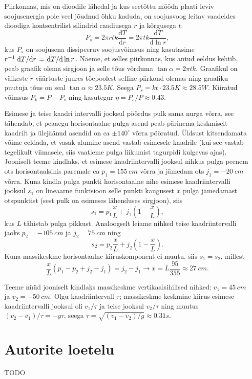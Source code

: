 \documentclass[10pt]{article}
\begin{document}

\solu
Piirkonnas, mis on dioodile lähedal ja kus seetõttu mööda plaati leviv soojusenergia pole veel jõudnud õhku kaduda, on soojusvoog leitav vaadeldes dioodiga kontsentrilist silindrid raadiusega $r$ ja kõrgusega $t$:
\[
P_s=2\pi rtk \frac{\mathrm d T}{\mathrm d r}=2\pi tk \frac{\mathrm d T}{\mathrm d \ln r},
\]
kus $P_s$ on soojusena dissipeeruv soojusvõimsus ning kasutasime $r^{-1}\dv*{T}{r} = \dv*{T}{\ln r}$. Näeme, et selles piirkonnas, kus antud eeldus kehtib, peab graafik olema sirgjoon ja selle tõus võrduma $\tan\alpha=2\pi tk$. Graafikul on väikeste $r$ väärtuste juures tõepoolest selline piirkond olemas ning graafiku puutuja tõus on seal $\tan\alpha\approx\SI{23.5}K$. Seega $P_s=kt\cdot \SI{23.5}K\approx \SI{28.5}W$. Kiiratud võimsus $P_k=P-P_s$ ning kasutegur $\eta=P_s/P\approx 0.43$.
\probend
\bigskip


\solu
Esimese ja teise kaadri intervalli jooksul pöördus pulk sama nurga võrra, see tähendab, et peaaegu horisontaalne pulga asend peab pärinema keskmiselt kaadrilt ja ülejäänud asendid on ca $\pm 140^\circ$ võrra pööratud. Üldsust kitsendamata võime eeldada, et vasak alumine asend vastab esimesele kaadrile (kui see vastab tegelikult viimasele, siis vaatleme pulga liikumist tagurpidi kulgevas ajas). Jooniselt teeme kindlaks, et esimese kaadriintervalli jooksul nihkus pulga peenem ots horisontaalsihis paremale ca $p_1=\SI{155}{cm}$ võrra ja jämedam ots $j_1=\SI{-20}{cm}$ võrra. Kuna kindla pulga punkti horisontaalne nihe esimese kaadriintervalli jooksul $s_1$ on lineaarne funktsioon selle punkti kaugusest $x$ pulga jämedamast otspunktist (sest pulk on esimeses lähenduses sirgjoon), siis 
\[
s_1=p_1\frac xL+j_1\left(1-\frac xL\right),
\]
kus $L$ tähistab pulga pikkust. Analoogselt leiame nihked teise kaadriintervalli jaoks $p_2=\SI{-105}{cm}$ ja $j_2=\SI{75}{cm}$ ning
\[
s_2=p_2\frac xL+j_2\left(1-\frac xL\right).
\]
Kuna massikeskme horisontaalne kiiruskomponent ei muutu, siis $s_1=s_2$, millest
\[
\frac xL(p_1-p_2+j_2-j_1)=j_2-j_1 \rightarrow x=L\frac{95}{355}\approx \SI{27}{cm}.
\]

Teeme nüüd jooniselt kindlaks massikeskme vertikaalsihilised nihked: $v_1=\SI{45}{cm}$ ja $v_2=\SI{-50}{cm}$.
Olgu kaadriintervall $\tau$; massikeskme keskmine kiirus esimese kaadriintervalli jooksul oli $v_1/\tau$ ja teise jooksul $v_2/\tau$ ning muutus $(v_2-v_1)/\tau= -g\tau$, seega $\tau=\sqrt{(v_1-v_2)/g}\approx \SI{0.31}s$.
\probend
\bigskip
\newpage

\section{Autorite loetelu}

TODO
\end{document}
